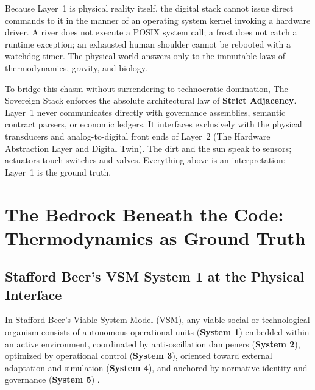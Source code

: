 Because Layer~1 is physical reality itself, the digital stack cannot issue direct commands to it in the manner of an operating system kernel invoking a hardware driver. A river does not execute a POSIX system call; a frost does not catch a runtime exception; an exhausted human shoulder cannot be rebooted with a watchdog timer. The physical world answers only to the immutable laws of thermodynamics, gravity, and biology. 

To bridge this chasm without surrendering to technocratic domination, The Sovereign Stack enforces the absolute architectural law of \textbf{Strict Adjacency}. Layer~1 never communicates directly with governance assemblies, semantic contract parsers, or economic ledgers. It interfaces exclusively with the physical transducers and analog-to-digital front ends of Layer~2 (The Hardware Abstraction Layer and Digital Twin). The dirt and the sun speak to sensors; actuators touch switches and valves. Everything above is an interpretation; Layer~1 is the ground truth.

\section{The Bedrock Beneath the Code: Thermodynamics as Ground Truth}
\label{sec:l1_bedrock}

\subsection{Stafford Beer's VSM System 1 at the Physical Interface}

In Stafford Beer's Viable System Model (VSM), any viable social or technological organism consists of autonomous operational units (\textbf{System 1}) embedded within an active environment, coordinated by anti-oscillation dampeners (\textbf{System 2}), optimized by operational control (\textbf{System 3}), oriented toward external adaptation and simulation (\textbf{System 4}), and anchored by normative identity and governance (\textbf{System 5}) \parencite{beer1972}.

